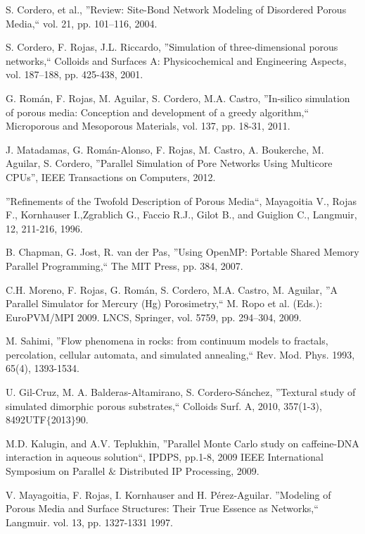 
\begin{thebibliography}{9}
 \bigskip
 \barra
 \bigskip

S. Cordero, et al., ''Review: Site-Bond Network Modeling of Disordered Porous Media,`` vol. 21, pp. 101–116, 2004.

S. Cordero, F. Rojas, J.L. Riccardo, ''Simulation of three-dimensional porous networks,`` Colloids and Surfaces A: Physicochemical and Engineering Aspects, vol. 187–188, pp. 425-438, 2001. 

G. Román, F. Rojas, M. Aguilar, S. Cordero, M.A. Castro, ''In-silico simulation of porous media: Conception and development of a greedy algorithm,`` Microporous and Mesoporous Materials, vol. 137, pp. 18-31, 2011. 

J. Matadamas, G. Román-Alonso, F. Rojas, M. Castro, A. Boukerche, M. Aguilar, S. Cordero, ''Parallel Simulation of Pore Networks Using Multicore CPUs”, IEEE Transactions on Computers, 2012. 

''Refinements of the Twofold Description of Porous Media``, Mayagoitia V., Rojas F., Kornhauser I.,Zgrablich G., Faccio R.J., Gilot B., and Guiglion C., Langmuir, 12, 211-216, 1996. 

B. Chapman, G. Jost, R. van der Pas, ''Using OpenMP: Portable Shared Memory Parallel Programming,`` The MIT Press, pp. 384, 2007. 

C.H. Moreno, F. Rojas, G. Román, S. Cordero, M.A. Castro, M. Aguilar, ''A Parallel Simulator for Mercury (Hg) Porosimetry,`` M. Ropo et al. (Eds.): EuroPVM/MPI 2009. LNCS, Springer, vol. 5759, pp. 294–304, 2009.

M. Sahimi, ''Flow phenomena in rocks: from continuum models to fractals, percolation, cellular automata, and simulated annealing,`` Rev. Mod. Phys. 1993, 65(4), 1393-1534. 

U. Gil-Cruz, M. A. Balderas-Altamirano, S. Cordero-Sánchez, ''Textural study of simulated dimorphic porous substrates,`` Colloids Surf. A, 2010, 357(1-3), 8492UTF$\{$2013$\}$90. 

M.D. Kalugin, and A.V. Teplukhin, ''Parallel Monte Carlo study on caffeine-DNA interaction in aqueous solution``, IPDPS, pp.1-8, 2009 IEEE International Symposium on Parallel $\&$ Distributed IP Processing, 2009. 

V. Mayagoitia, F. Rojas, I. Kornhauser and H. Pérez-Aguilar. ''Modeling of Porous Media and Surface Structures: Their True Essence as Networks,`` Langmuir. vol. 13, pp. 1327-1331 1997.


\end{thebibliography}
